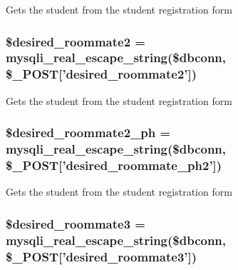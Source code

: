\-Gets the student from the student registration form \hypertarget{admin__view_2validate_2studentVal_8php_aeaab2ccbd0e9359193a66a1c07606bf8}{
\subsubsection[{\$desired\-\_\-roommate2}]{\setlength{\rightskip}{0pt plus 5cm}\$desired\-\_\-roommate2 = mysqli\-\_\-real\-\_\-escape\-\_\-string(\$dbconn, \$\-\_\-\-P\-O\-S\-T\mbox{[}'desired\-\_\-roommate2'\mbox{]})}}\label{admin__view_2validate_2studentVal_8php_aeaab2ccbd0e9359193a66a1c07606bf8}
\-Gets the student from the student registration form \hypertarget{admin__view_2validate_2studentVal_8php_ac9a221d01a865e9db4fd8d517db1f5f1}{
\subsubsection[{\$desired\-\_\-roommate2\-\_\-ph}]{\setlength{\rightskip}{0pt plus 5cm}\$desired\-\_\-roommate2\-\_\-ph = mysqli\-\_\-real\-\_\-escape\-\_\-string(\$dbconn, \$\-\_\-\-P\-O\-S\-T\mbox{[}'desired\-\_\-roommate\-\_\-ph2'\mbox{]})}}\label{admin__view_2validate_2studentVal_8php_ac9a221d01a865e9db4fd8d517db1f5f1}
\-Gets the student from the student registration form \hypertarget{admin__view_2validate_2studentVal_8php_a6c6068b6183d30d97211b0acc4c44e97}{
\subsubsection[{\$desired\-\_\-roommate3}]{\setlength{\rightskip}{0pt plus 5cm}\$desired\-\_\-roommate3 = mysqli\-\_\-real\-\_\-escape\-\_\-string(\$dbconn, \$\-\_\-\-P\-O\-S\-T\mbox{[}'desired\-\_\-roommate3'\mbox{]})}}\label{admin__view_2validate_2studentVal_8php_a6c6068b6183d30d97211b0acc4c44e97}
